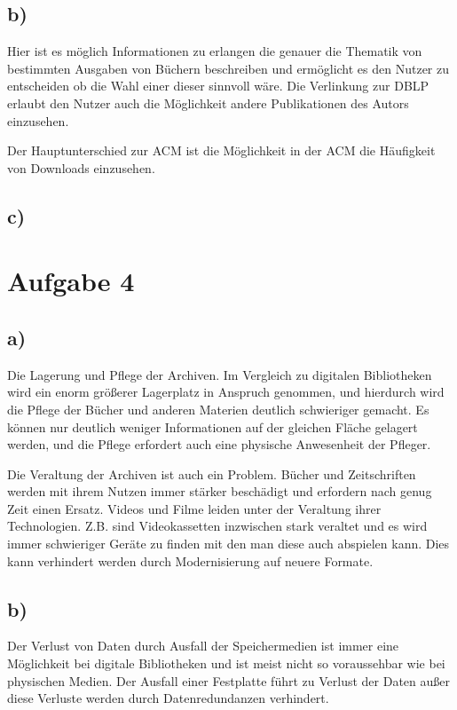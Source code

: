 \documentclass[11pt,a4paper,parskip=half ]{scrartcl}
\begin{document}
	\subsection*{b)}
		Hier ist es möglich Informationen zu erlangen die genauer die Thematik von bestimmten Ausgaben von Büchern beschreiben und ermöglicht es den Nutzer zu entscheiden ob die Wahl einer dieser sinnvoll wäre. Die Verlinkung zur DBLP erlaubt den Nutzer auch die Möglichkeit andere Publikationen des Autors einzusehen.
		
		Der Hauptunterschied zur ACM ist die Möglichkeit in der ACM die Häufigkeit von Downloads einzusehen.
	\subsection*{c)}
	
	\section*{Aufgabe 4}
	\subsection*{a)}
		Die Lagerung und Pflege der Archiven. Im Vergleich zu digitalen Bibliotheken wird ein enorm größerer Lagerplatz in Anspruch genommen, und hierdurch wird die Pflege der Bücher und anderen Materien deutlich schwieriger gemacht. Es können nur deutlich weniger Informationen auf der gleichen Fläche gelagert werden, und die Pflege erfordert auch eine physische Anwesenheit der Pfleger.
		
		Die Veraltung der Archiven ist auch ein Problem. Bücher und Zeitschriften werden mit ihrem Nutzen immer stärker beschädigt und erfordern nach genug Zeit einen Ersatz. Videos und Filme leiden unter der Veraltung ihrer Technologien. Z.B. sind Videokassetten inzwischen stark veraltet und es wird immer schwieriger Geräte zu finden mit den man diese auch abspielen kann. Dies kann verhindert werden durch Modernisierung auf neuere Formate.
		
	\subsection*{b)}
		Der Verlust von Daten durch Ausfall der Speichermedien ist immer eine Möglichkeit bei digitale Bibliotheken und ist meist nicht so voraussehbar wie bei physischen Medien. Der Ausfall einer Festplatte führt zu Verlust der Daten außer diese Verluste werden durch Datenredundanzen verhindert.
		
\end{document}
